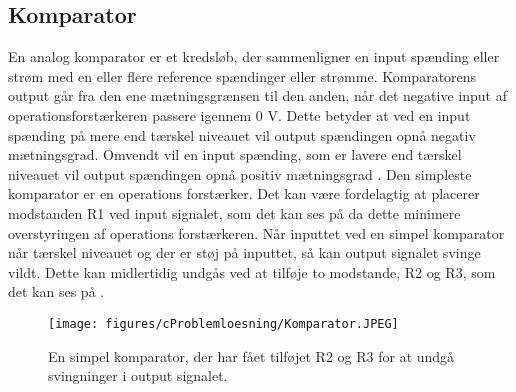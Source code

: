 \subsection{Komparator}
En analog komparator er et kredsløb, der sammenligner en input spænding eller strøm med en eller flere reference spændinger eller strømme. Komparatorens output går fra den ene mætningsgrænsen til den anden, når det negative input af operationsforstærkeren passere igennem 0 V. Dette betyder at ved en input spænding på mere end tærskel niveauet vil output spændingen opnå negativ mætningsgrad. Omvendt vil en input spænding, som er lavere end tærskel niveauet vil output spændingen opnå positiv mætningsgrad .  Den simpleste komparator er en operations forstærker. Det kan være fordelagtig at placerer modstanden R1 ved input signalet, som det kan ses på  da dette minimere overstyringen  af operations forstærkeren.  Når inputtet ved en simpel komparator når tærskel niveauet og der er støj på inputtet, så kan output signalet svinge vildt. Dette kan midlertidig undgås ved at tilføje to modstande, R2 og R3, som det kan ses på .  \cite{webster2009}
\begin{figure}[H]
\centering
\texttt{[image: figures/cProblemloesning/Komparator.JPEG]}
\caption{En simpel komparator, der har fået tilføjet R2 og R3 for at undgå svingninger i output signalet.}
\label{komparator}
\end{figure}
